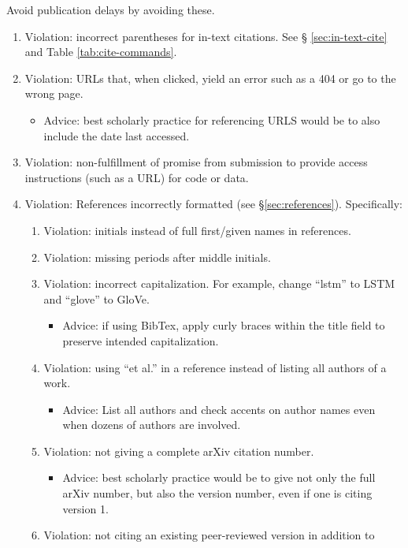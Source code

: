 \documentclass[11pt,a4paper]{article}
\begin{document}
Avoid publication delays by avoiding these.
\begin{enumerate}
\item Violation: incorrect parentheses for in-text citations.  See \S
\ref{sec:in-text-cite} and Table \ref{tab:cite-commands}.
\item Violation: URLs that, when clicked, yield an error such as a 404 or go
to the wrong page.
  \begin{itemize}
     \item Advice: best scholarly practice for referencing URLS would be to also
     include the date last accessed.
  \end{itemize}
\item Violation: non-fulfillment of promise from submission to provide access
instructions (such as a URL) for code or data.
\item Violation: References incorrectly formatted (see \S\ref{sec:references}).
Specifically:
\begin{enumerate}
  \item Violation: initials instead of full first/given names in references.
  \item Violation: missing periods after middle initials.
  \item Violation: incorrect capitalization.  For example, change ``lstm'' to
  LSTM and ``glove'' to GloVe.
  \begin{itemize}
    \item Advice: if using BibTex, apply curly braces within the title field to
    preserve intended capitalization.
  \end{itemize}
  \item Violation: using ``et al.'' in a reference instead of listing all
  authors of a work.
  \begin{itemize}
    \item Advice: List all authors and check accents on author names even when
    dozens of authors are involved.
  \end{itemize}
  \item Violation: not giving a complete arXiv citation number.
  \begin{itemize}
     \item Advice: best scholarly practice would be to give not only the full
     arXiv number, but also the version number, even if one is citing version 1.
  \end{itemize}
  \item Violation: not citing an existing peer-reviewed version in addition to

\end{enumerate}
\end{enumerate}
\end{document}
